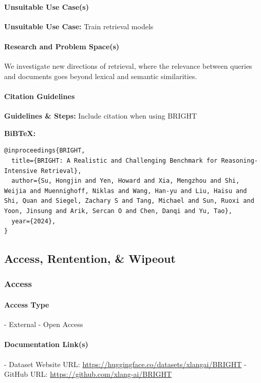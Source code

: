 \paragraph{Unsuitable Use Case(s)}
\textbf{Unsuitable Use Case:} Train retrieval models

\paragraph{Research and Problem Space(s)}
We investigate new directions of retrieval, where the relevance between queries and documents goes beyond lexical and semantic similarities.

\paragraph{Citation Guidelines}
\textbf{Guidelines \& Steps:} Include citation when using BRIGHT

\textbf{BiBTeX:}
\begin{lstlisting}[breaklines]
    @inproceedings{BRIGHT,
  title={BRIGHT: A Realistic and Challenging Benchmark for Reasoning-Intensive Retrieval},
  author={Su, Hongjin and Yen, Howard and Xia, Mengzhou and Shi, Weijia and Muennighoff, Niklas and Wang, Han-yu and Liu, Haisu and Shi, Quan and Siegel, Zachary S and Tang, Michael and Sun, Ruoxi and Yoon, Jinsung and Arik, Sercan O and Chen, Danqi and Yu, Tao},
  year={2024},
}
\end{lstlisting}


\subsection{Access, Rentention, \& Wipeout}
\subsubsection{Access}
\paragraph{Access Type}
- External - Open Access

\paragraph{Documentation Link(s)}
- Dataset Website URL: \url{https://huggingface.co/datasets/xlangai/BRIGHT}
- GitHub URL: \url{https://github.com/xlang-ai/BRIGHT}

